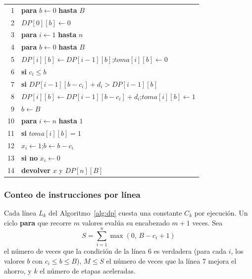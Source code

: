 \documentclass[11pt,a4paper]{article}
\theoremstyle{definition}
\begin{document}
\begin{algorithm}[ht]
\caption{Programación dinámica para la cadena. Entrada: $n$, $t,c,d$ (en el orden de la cadena) y $B$. Salida: $x\in\{0,1\}^n$ y el ahorro máximo.}
\label{alg:dp}
\small
\begin{tabular}{@{}r@{\hspace{1em}}l@{}}
1 & \textbf{para} $b\gets 0$ \textbf{hasta} $B$ \\
2 & \quad $DP[0][b]\gets 0$ \\
3 & \textbf{para} $i\gets 1$ \textbf{hasta} $n$ \\
4 & \quad \textbf{para} $b\gets 0$ \textbf{hasta} $B$ \\
5 & \quad\quad $DP[i][b]\gets DP[i-1][b]$;\quad $toma[i][b]\gets 0$ \\
6 & \quad\quad \textbf{si} $c_i\le b$ \\
7 & \quad\quad\quad \textbf{si} $DP[i-1][b-c_i]+d_i>DP[i-1][b]$ \\
8 & \quad\quad\quad\quad $DP[i][b]\gets DP[i-1][b-c_i]+d_i$;\quad $toma[i][b]\gets 1$ \\
9 & $b\gets B$ \\
10 & \textbf{para} $i\gets n$ \textbf{hasta} $1$ \\
11 & \quad \textbf{si} $toma[i][b]=1$ \\
12 & \quad\quad $x_i\gets 1$;\quad $b\gets b-c_i$ \\
13 & \quad \textbf{si no} $x_i\gets 0$ \\
14 & \textbf{devolver} $x$ y $DP[n][B]$ \\
\end{tabular}
\end{algorithm}

\subsubsection*{Conteo de instrucciones por línea}

Cada línea $L_k$ del Algoritmo~\ref{alg:dp} cuesta una constante $C_k$ por ejecución. Un ciclo \textbf{para} que recorre $m$ valores evalúa su encabezado $m+1$ veces. Sea
\[
S=\sum_{i=1}^{n}\max(0,\,B-c_i+1)
\]
el número de veces que la condición de la línea 6 es verdadera (para cada $i$, los valores $b$ con $c_i\le b\le B$), $M\le S$ el número de veces que la línea 7 mejora el ahorro, y $k$ el número de etapas aceleradas.
\end{document}
